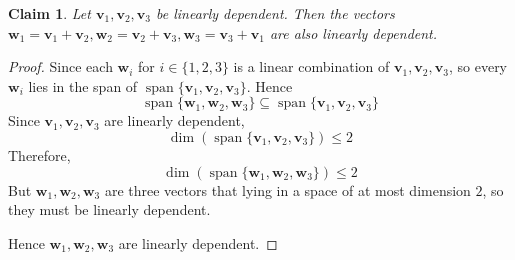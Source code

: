 \documentclass{article}
\DeclareMathOperator{\spn}{span}
\newtheorem*{claim}{Claim}
\begin{document}
\begin{claim}
    Let $\mathbf{v}_1, \mathbf{v}_2, \mathbf{v}_3$ be linearly dependent. Then the vectors 
    $\mathbf{w}_1 = \mathbf{v}_1 + \mathbf{v}_2, \mathbf{w}_2 = \mathbf{v}_2 + \mathbf{v}_3, 
    \mathbf{w}_3 = \mathbf{v}_3 + \mathbf{v}_1$ are also linearly dependent. 
\end{claim}

\begin{proof}
    Since each $\mathbf{w}_i$ for $i \in \{1, 2, 3\}$ is a linear combination of 
    $\mathbf{v}_1, \mathbf{v}_2, \mathbf{v}_3$, so every $\mathbf{w}_i$ lies in the span of 
    $\spn\{\mathbf{v}_1, \mathbf{v}_2, \mathbf{v}_3\}$. Hence 
    \[
    \spn\{\mathbf{w}_1, \mathbf{w}_2, \mathbf{w}_3\} 
    \subseteq \spn\{\mathbf{v}_1, \mathbf{v}_2, \mathbf{v}_3\}
    \]
    Since $\mathbf{v}_1, \mathbf{v}_2, \mathbf{v}_3$ are linearly dependent,
    \[
    \dim(\spn\{\mathbf{v}_1, \mathbf{v}_2, \mathbf{v}_3\}) \leq 2
    \]
    Therefore, 
    \[
    \dim(\spn\{\mathbf{w}_1, \mathbf{w}_2, \mathbf{w}_3\} ) \leq 2
    \]
    But $\mathbf{w}_1, \mathbf{w}_2, \mathbf{w}_3$ are three vectors that lying in a space of at most 
    dimension $2$, so they must be linearly dependent.

    \medskip

    Hence $\mathbf{w}_1, \mathbf{w}_2, \mathbf{w}_3$ are linearly dependent.
\end{proof}
\end{document}

